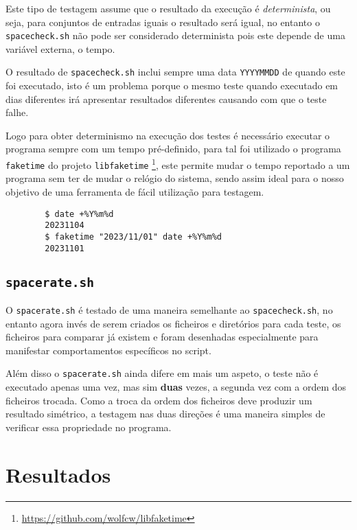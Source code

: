 Este tipo de testagem assume que o resultado da execução é \emph{determinista},
ou seja, para conjuntos de entradas iguais o resultado será igual, no entanto
o \Verb|spacecheck.sh| não pode ser considerado determinista pois este depende
de uma variável externa, o tempo.

O resultado de \Verb|spacecheck.sh| inclui sempre uma data \Verb|YYYYMMDD| de
quando este foi executado, isto é um problema porque o mesmo teste quando
executado em dias diferentes irá apresentar resultados diferentes causando com
que o teste falhe.

Logo para obter determinismo na execução dos testes é necessário executar o
programa sempre com um tempo pré-definido, para tal foi utilizado o programa
\Verb|faketime| do projeto \Verb|libfaketime|
\footnote{\url{https://github.com/wolfcw/libfaketime}},
este permite mudar o tempo reportado a um programa sem ter de mudar o relógio
do sistema, sendo assim ideal para o nosso objetivo de uma ferramenta de fácil
utilização para testagem.

\begin{listing}[H]
	\centering
	\begin{verbatim}
		$ date +%Y%m%d
		20231104
		$ faketime "2023/11/01" date +%Y%m%d
		20231101
	\end{verbatim}
	\cprotect\caption{Exemplo do funcionamento de \Verb|faketime|.}
\end{listing}

\cprotect\subsection{\Verb|spacerate.sh|}

O \Verb|spacerate.sh| é testado de uma maneira semelhante ao
\Verb|spacecheck.sh|, no entanto agora invés de serem criados os ficheiros e
diretórios para cada teste, os ficheiros para comparar já existem e foram
desenhadas especialmente para manifestar comportamentos específicos no script.

Além disso o \Verb|spacerate.sh| ainda difere em mais um aspeto, o teste não é
executado apenas uma vez, mas sim \textbf{duas} vezes, a segunda vez com a ordem
dos ficheiros trocada. Como a troca da ordem dos ficheiros deve produzir um
resultado simétrico, a testagem nas duas direções é uma maneira simples de
verificar essa propriedade no programa.

\section{Resultados}

